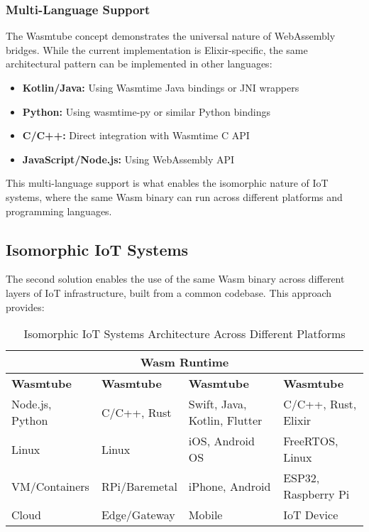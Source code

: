 \documentclass[11pt]{article}
\begin{document}
\subsubsection{Multi-Language Support}

The Wasmtube concept demonstrates the universal nature of WebAssembly bridges. While the current implementation is Elixir-specific, the same architectural pattern can be implemented in other languages:

\begin{itemize}
\item \textbf{Kotlin/Java:} Using Wasmtime Java bindings or JNI wrappers
\item \textbf{Python:} Using wasmtime-py or similar Python bindings
\item \textbf{C/C++:} Direct integration with Wasmtime C API
\item \textbf{JavaScript/Node.js:} Using WebAssembly API
\end{itemize}

This multi-language support is what enables the isomorphic nature of IoT systems, where the same Wasm binary can run across different platforms and programming languages.

\subsection{Isomorphic IoT Systems}

The second solution enables the use of the same Wasm binary across different layers of IoT infrastructure, built from a common codebase. This approach provides:

\begin{table}[h]
\centering
\small
\begin{tabular}{|p{2.5cm}|p{2.5cm}|p{2.5cm}|p{2.5cm}|}
\hline
\multicolumn{4}{|c|}{\textbf{Wasm Runtime}} \\
\hline
\rowcolor{gray!30}
\textbf{Wasmtube} & \textbf{Wasmtube} & \textbf{Wasmtube} & \textbf{Wasmtube} \\
\hline
Node.js, Python & C/C++, Rust & Swift, Java, Kotlin, Flutter & C/C++, Rust, Elixir \\
\hline
Linux & Linux & iOS, Android OS & FreeRTOS, Linux \\
\hline
VM/Containers & RPi/Baremetal & iPhone, Android & ESP32, Raspberry Pi \\
\hline
Cloud & Edge/Gateway & Mobile & IoT Device \\
\hline
\end{tabular}
\caption{Isomorphic IoT Systems Architecture Across Different Platforms}
\end{table}
\end{document}
